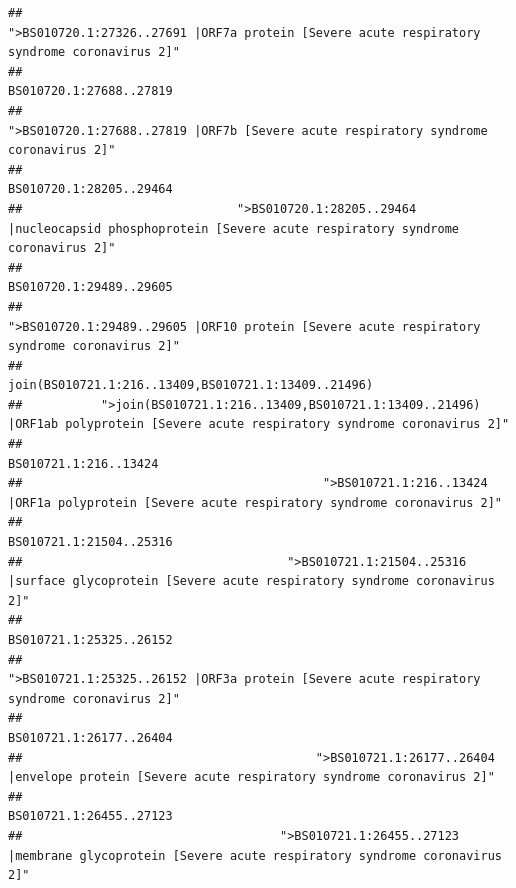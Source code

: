 \documentclass[
]{article}
\begin{document}
\begin{verbatim}
##                                            ">BS010720.1:27326..27691 |ORF7a protein [Severe acute respiratory syndrome coronavirus 2]" 
##                                                                                                                BS010720.1:27688..27819 
##                                                    ">BS010720.1:27688..27819 |ORF7b [Severe acute respiratory syndrome coronavirus 2]" 
##                                                                                                                BS010720.1:28205..29464 
##                              ">BS010720.1:28205..29464 |nucleocapsid phosphoprotein [Severe acute respiratory syndrome coronavirus 2]" 
##                                                                                                                BS010720.1:29489..29605 
##                                            ">BS010720.1:29489..29605 |ORF10 protein [Severe acute respiratory syndrome coronavirus 2]" 
##                                                                                    join(BS010721.1:216..13409,BS010721.1:13409..21496) 
##           ">join(BS010721.1:216..13409,BS010721.1:13409..21496) |ORF1ab polyprotein [Severe acute respiratory syndrome coronavirus 2]" 
##                                                                                                                  BS010721.1:216..13424 
##                                          ">BS010721.1:216..13424 |ORF1a polyprotein [Severe acute respiratory syndrome coronavirus 2]" 
##                                                                                                                BS010721.1:21504..25316 
##                                     ">BS010721.1:21504..25316 |surface glycoprotein [Severe acute respiratory syndrome coronavirus 2]" 
##                                                                                                                BS010721.1:25325..26152 
##                                            ">BS010721.1:25325..26152 |ORF3a protein [Severe acute respiratory syndrome coronavirus 2]" 
##                                                                                                                BS010721.1:26177..26404 
##                                         ">BS010721.1:26177..26404 |envelope protein [Severe acute respiratory syndrome coronavirus 2]" 
##                                                                                                                BS010721.1:26455..27123 
##                                    ">BS010721.1:26455..27123 |membrane glycoprotein [Severe acute respiratory syndrome coronavirus 2]" 

\end{verbatim}
\end{document}
